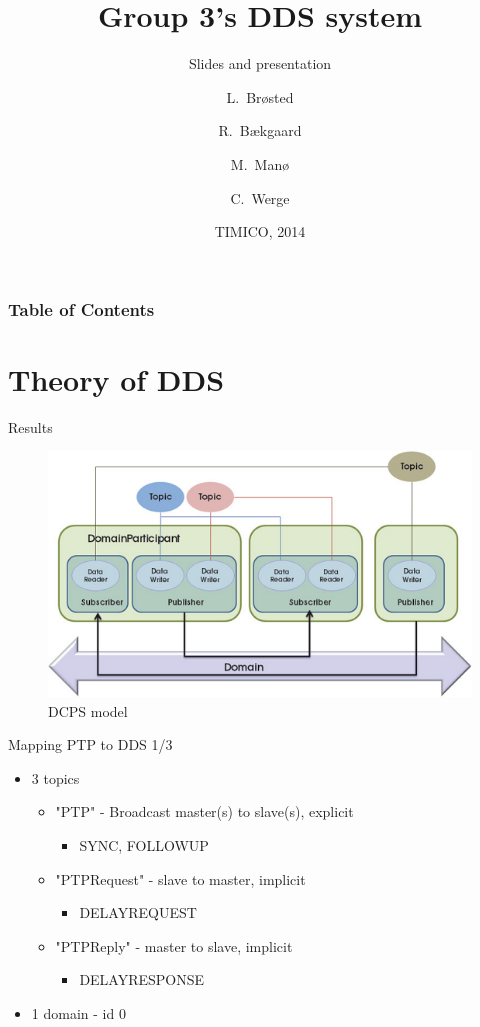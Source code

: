 \documentclass[compressed, presentation, notheorems, 12pt]{beamer}
\title{Group 3's DDS system}
\subtitle{Slides and presentation}
\author[Author, Anders] %
{L.~Brøsted \and R.~Bækgaard \and M.~Manø \and C.~Werge}
\institute
{
  Aarhus University \\
  School of Engineering
}
\date{TIMICO, 2014}
\begin{document}
 	\frame{\titlepage}

\begin{frame}
\frametitle{Table of Contents}
\tableofcontents%
\end{frame}

\section{Theory of DDS}

\begin{frame}{Results}

\begin{figure}[hbtp]
\centering
\includegraphics[width =0.9 \textwidth]{RTI_EntityOverview_small}
\caption{DCPS model}
\end{figure}


\end{frame}


\begin{frame}{Mapping PTP to DDS 1/3}
\begin{itemize}
	\item 3 topics
	\begin{itemize}
		\item "PTP" - Broadcast master(s) to slave(s), explicit
		\begin{itemize}
			\item SYNC, FOLLOWUP
		\end{itemize}
		\item "PTPRequest" - slave to master, implicit
		\begin{itemize}
			\item DELAYREQUEST
		\end{itemize}
		\item "PTPReply" - master to slave, implicit
		\begin{itemize}
		 	\item DELAYRESPONSE
		 \end{itemize} 
	\end{itemize}

	\item  1 domain - id 0
\end{itemize}
\end{frame}
\end{document}
